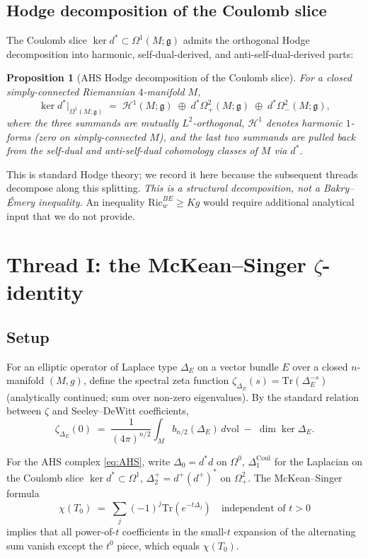 \documentclass[11pt,letterpaper]{article}
\newtheorem{proposition}[theorem]{Proposition}
\theoremstyle{definition}
\newcommand{\cH}{\mathcal{H}}
\newcommand{\fg}{\mathfrak{g}}
\newcommand{\Tr}{\mathrm{Tr}}
\newcommand{\Ric}{\mathrm{Ric}}
\newcommand{\dvol}{\,d\mathrm{vol}}
\newcommand{\Lap}{\Delta}
\begin{document}
\subsection*{Hodge decomposition of the Coulomb slice}

The Coulomb slice $\ker d^* \subset \Omega^1(M;\fg)$ admits the orthogonal Hodge decomposition into harmonic, self-dual-derived, and anti-self-dual-derived parts:

\begin{proposition}[AHS Hodge decomposition of the Coulomb slice]\label{prop:BE-decomp}
For a closed simply-connected Riemannian $4$-manifold $M$,
\[
\ker d^*\bigr|_{\Omega^1(M;\fg)} \;=\; \cH^1(M;\fg) \;\oplus\; d^*\Omega^2_+(M;\fg) \;\oplus\; d^*\Omega^2_-(M;\fg),
\]
where the three summands are mutually $L^2$-orthogonal, $\cH^1$ denotes harmonic $1$-forms (zero on simply-connected $M$), and the last two summands are pulled back from the self-dual and anti-self-dual cohomology classes of $M$ via $d^*$.
\end{proposition}

This is standard Hodge theory; we record it here because the subsequent threads decompose along this splitting. \emph{This is a structural decomposition, not a Bakry--\'Emery inequality.} An inequality $\Ric^{BE}_w \ge K g$ would require additional analytical input that we do not provide.

\section{Thread I: the McKean--Singer $\zeta$-identity}\label{sec:zeta-identity}

\subsection{Setup}

For an elliptic operator of Laplace type $\Lap_E$ on a vector bundle $E$ over a closed $n$-manifold $(M,g)$, define the spectral zeta function $\zeta_{\Lap_E}(s) = \Tr(\Lap_E^{-s})$ (analytically continued; sum over non-zero eigenvalues). By the standard relation between $\zeta$ and Seeley--DeWitt coefficients,
\begin{equation}\label{eq:zeta-a}
\zeta_{\Lap_E}(0) \;=\; \frac{1}{(4\pi)^{n/2}}\int_M b_{n/2}(\Lap_E)\dvol \;-\; \dim\ker\Lap_E.
\end{equation}

For the AHS complex \eqref{eq:AHS}, write $\Lap_0 = d^*d$ on $\Omega^0$, $\Lap_1^{\mathrm{Coul}}$ for the Laplacian on the Coulomb slice $\ker d^* \subset \Omega^1$, $\Lap_2^+ = d^+(d^+)^*$ on $\Omega^2_+$. The McKean--Singer formula
\begin{equation}\label{eq:MS}
\chi(T_0) \;=\; \sum_j(-1)^j \Tr(e^{-t\Lap_j}) \quad\text{independent of }t > 0
\end{equation}
implies that all power-of-$t$ coefficients in the small-$t$ expansion of the alternating sum vanish except the $t^0$ piece, which equals $\chi(T_0)$.
\end{document}
